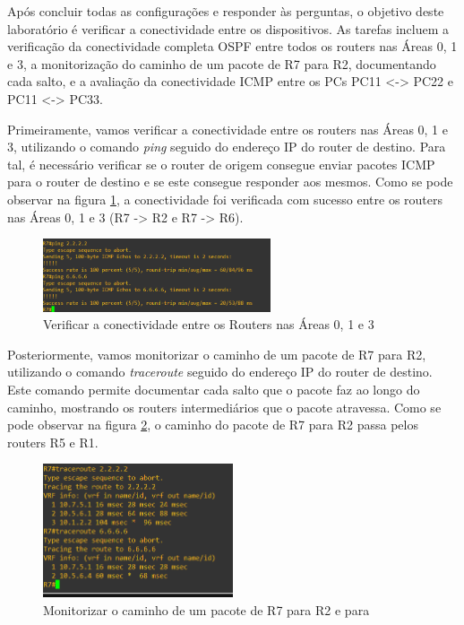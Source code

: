 \documentclass[11pt,english, openright, oneside]{book}
\begin{document}
\par Após concluir todas as configurações e responder às perguntas, o objetivo deste laboratório é verificar a conectividade entre os dispositivos. As tarefas incluem a verificação da conectividade completa OSPF entre todos os routers nas Áreas 0, 1 e 3, a monitorização do caminho de um pacote de R7 para R2, documentando cada salto, e a avaliação da conectividade ICMP entre os PCs PC11 <-> PC22 e PC11 <-> PC33.

\par Primeiramente, vamos verificar a conectividade entre os routers nas Áreas 0, 1 e 3, utilizando o comando \textit{ping} seguido do endereço IP do router de destino. Para tal, é necessário verificar se o router de origem consegue enviar pacotes ICMP para o router de destino e se este consegue responder aos mesmos. Como se pode observar na figura \ref{fig:config27}, a conectividade foi verificada com sucesso entre os routers nas Áreas 0, 1 e 3 (R7 -> R2 e R7 -> R6).

\begin{figure}[H]
    \centering
    \includegraphics[width=0.6\textwidth]{imagens/Tarefa3/16.ping_R7_R2_R6.png}
    \caption{Verificar a conectividade entre os Routers nas Áreas 0, 1 e 3}
    \label{fig:config27}
\end{figure}
\vspace{0.1cm}

\par Posteriormente, vamos monitorizar o caminho de um pacote de R7 para R2, utilizando o comando \textit{traceroute} seguido do endereço IP do router de destino. Este comando permite documentar cada salto que o pacote faz ao longo do caminho, mostrando os routers intermediários que o pacote atravessa. Como se pode observar na figura \ref{fig:config28}, o caminho do pacote de R7 para R2 passa pelos routers R5 e R1.

\begin{figure}[H]
    \centering
    \includegraphics[width=0.50\textwidth]{imagens/Tarefa3/16.traceroute_R7_R2_R6.png}
    \caption{Monitorizar o caminho de um pacote de R7 para R2 e para }
    \label{fig:config28}
\end{figure}
\vspace{0.2cm}
\end{document}
